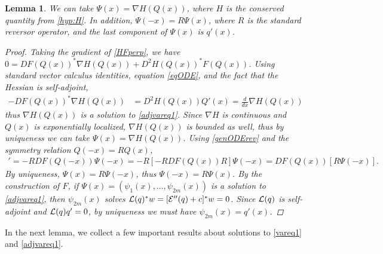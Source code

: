 \documentclass[10pt,reqno]{amsart}
\theoremstyle{plain}
\newtheorem{lemma}[theorem]{Lemma}
\theoremstyle{definition}
\theoremstyle{remark}
\numberwithin{theorem}{section}
\numberwithin{equation}{section}
\begin{document}
\begin{lemma}\label{psiform}
We can take $\Psi(x) = \nabla H(Q(x))$, where $H$ is the conserved quantity from \cref{hyp:H}. In addition, $\Psi(-x) = R \Psi(x)$, where $R$ is the standard reversor operator, and the last component of $\Psi(x)$ is $q'(x)$.
\begin{proof}
Taking the gradient of \cref{HFperp}, we have $0 = D F(Q(x))^* \nabla H(Q(x)) + D^2 H(Q(x))^* F(Q(x))$. Using standard vector calculus identities, equation \cref{eqODE}, and the fact that the Hessian is self-adjoint,
\begin{align*}
-D F(Q(x))^* \nabla H(Q(x)) &= D^2 H(Q(x)) Q'(x) = \frac{d}{dx} \nabla H(Q(x))
\end{align*}
thus $\nabla H(Q(x))$ is a solution to \eqref{adjvareq1}. Since $\nabla H$ is continuous and $Q(x)$ is exponentially localized, $\nabla H(Q(x))$ is bounded as well, thus by uniqueness we can take $\Psi(x) = \nabla H(Q(x))$. Using \eqref{genODErev} and the symmetry relation $Q(-x) = R Q(x)$, 
\begin{align*}
[R \Psi(-x)]' = -R DF(Q(-x)) \Psi(-x) 
= -R [-RDF(Q(x))R] \Psi(-x) = DF(Q(x))[ R \Psi(-x) ].
\end{align*}
By uniqueness, $\Psi(x) = R \Psi(-x)$, thus $\Psi(-x) = R \Psi(x)$. By the construction of $F$, if $\Psi(x) = (\psi_1(x), \dots, \psi_{2m}(x))$ is a solution to \cref{adjvareq1}, then $\psi_{2m}(x)$ solves $\mathcal{L}(q)^* w = [\mathcal{E}''(q) + c]^* w = 0$. Since $\mathcal{L}(q)$ is self-adjoint and $\mathcal{L}(q)q' = 0$, by uniqueness we must have $\psi_{2m}(x) = q'(x)$.
\end{proof}
\end{lemma}

In the next lemma, we collect a few important results about solutions to \cref{vareq1} and \cref{adjvareq1}.
\end{document}
